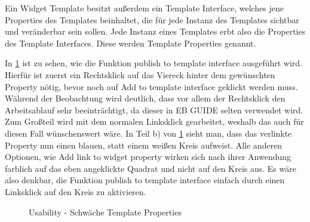 Ein Widget Template besitzt außerdem ein Template Interface, welches jene Properties des Templates beinhaltet, die für jede Instanz des Templates sichtbar und veränderbar sein sollen.
Jede Instanz eines Templates erbt also die Properties des Template Interfaces.
Diese werden Template Properties genannt.\cite{studio_guide}

In \cref{fig:TemplateProperties} ist zu sehen, wie die Funktion \glqq publish to template interface\grqq{} ausgeführt wird.
Hierfür ist zuerst ein Rechtsklick auf das Viereck hinter dem gewünschten Property nötig, bevor noch auf \glqq Add to template interface\grqq{} geklickt werden muss.
Während der Beobachtung wird deutlich, dass vor allem der Rechtsklick den Arbeitsablauf sehr beeinträchtigt, da dieser in EB GUIDE selten verwendet wird. 
Zum Großteil wird mit dem normalen Linksklick gearbeitet, weshalb das auch für diesen Fall wünschenswert wäre.
In Teil b) von \cref{fig:TemplateProperties} sieht man, dass das verlinkte Property nun einen blauen, statt einem weißen Kreis aufweist.
Alle anderen Optionen, wie  \glqq Add link to widget property\grqq{} wirken sich nach ihrer Anwendung farblich auf das eben angeklickte Quadrat und nicht auf den Kreis aus.
Es wäre also denkbar, die Funktion \glqq publish to template interface\grqq{} einfach durch einen Linksklick auf den Kreis zu aktivieren.

\begin{figure}[H]
  \centering
  \qquad
  \caption{Usability - Schwäche Template Properties}%
  \label{fig:TemplateProperties}
\end{figure}


